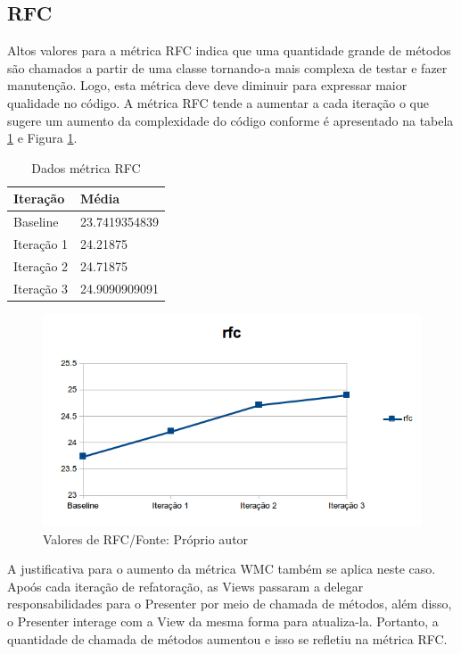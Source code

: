 \subsection{RFC}

Altos valores para a métrica RFC indica que uma quantidade grande de métodos são
chamados a partir de uma classe tornando-a mais complexa de testar e fazer
manutenção. Logo, esta métrica deve deve diminuir para expressar maior
qualidade no código. A métrica RFC tende a aumentar a cada iteração o que sugere
um aumento da complexidade do código conforme é apresentado na tabela \ref{tab:rfc} e Figura
\ref{fig:rfc}.

\begin{table}[h]
	\centering
	    \caption{Dados métrica RFC}
    \begin{tabular}{ | l | l | }
    \hline
    Iteração & Média 			\\ \hline
    Baseline & 23.7419354839   	\\ \hline
    Iteração 1 & 24.21875		\\ \hline
	Iteração 2 & 24.71875		\\ \hline
	Iteração 3 & 24.9090909091	\\ \hline
    \end{tabular}
    \label{tab:rfc}
\end{table}

\begin{figure}[h]
	\centering
	\includegraphics{img/rfc.png}
	\caption{Valores de RFC/Fonte: Próprio autor}
	\label{fig:rfc}
\end{figure}

A justificativa para o aumento da métrica WMC também se aplica neste caso.
Apoós cada iteração de refatoração, as Views passaram a delegar
responsabilidades para o Presenter por meio de chamada de métodos, além disso, o Presenter interage com a
View da mesma forma para atualiza-la. Portanto, a quantidade de chamada de
métodos aumentou e isso se refletiu na métrica RFC.

